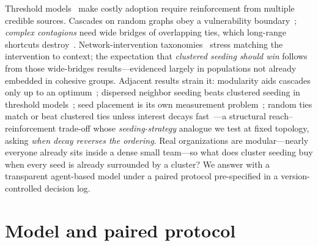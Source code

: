 \documentclass{llncs}
\begin{document}
Threshold models~\cite{granovetter1978} make costly adoption require
reinforcement from multiple credible sources. Cascades on random graphs obey a vulnerability
boundary~\cite{watts2002}; \emph{complex contagions} need wide bridges of
overlapping ties, which long-range shortcuts destroy~\cite{centola2007,centola2010}.
Network-intervention taxonomies~\cite{valente2012} stress matching the
intervention to context; the expectation that \emph{clustered seeding should
win} follows from those wide-bridges results---evidenced largely in
populations not already embedded in cohesive groups. Adjacent results
strain it: modularity aids cascades only up to an
optimum~\cite{nematzadeh2014}; dispersed neighbor seeding beats clustered
seeding in threshold models~\cite{ou2022}; seed placement is its own
measurement problem~\cite{guilbeault2021,tanase2026}; random ties match or
beat clustered ties unless interest decays
fast~\cite{wan2025,sassine2024}---a structural reach--reinforcement
trade-off whose \emph{seeding-strategy} analogue we test at fixed topology,
asking \emph{when decay reverses the ordering}. Real organizations are
modular---nearly everyone already sits inside a dense small team---so what
does cluster seeding buy when every seed is already surrounded by a cluster?
We answer with a transparent agent-based model under a paired protocol
pre-specified in a version-controlled decision log.

\section{Model and paired protocol}
\label{sec:model}
\end{document}
